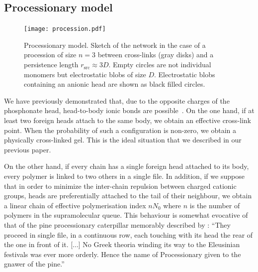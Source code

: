 \documentclass[journal=jacsat,manuscript=article]{achemso}
\begin{document}

\subsection{Processionary model}

\begin{figure}
\texttt{[image: procession.pdf]}
\caption{Processionary model. Sketch of the network in the case of a procession of size $n=3$ between cross-links (gray disks) and a persistence length $r_\mathrm{src}\approx 3D$. Empty circles are not individual monomers but electrostatic blobs of size $D$. Electrostatic blobs containing an anionic head are shown as black filled circles.}
\label{fig:dissociation}
\end{figure}

We have previously demonstrated that, due to the opposite charges of the phosphonate head, head-to-body ionic bonds are possible~\cite{Srour2014}. On the one hand, if at least two foreign heads attach to the same body, we obtain an effective cross-link point. When the probability of such a configuration is non-zero, we obtain a physically cross-linked gel. This is the ideal situation that we described in our previous paper.

On the other hand, if every chain has a single foreign head attached to its body, every polymer is linked to two others in a single file. In addition, if we suppose that in order to minimize the inter-chain repulsion between charged cationic groups, heads are preferentially attached to the tail of their neighbour, we obtain a linear chain of effective polymerisation index $n N_0$ where $n$ is the number of polymers in the supramolecular queue. This behaviour is somewhat evocative of that of the pine processionary caterpillar memorably described by \citet{Fabre1916}: 
``They proceed in single file, in a continuous row, each touching with its head the rear of the one in front of it. [...] No Greek theoria winding its way to the Eleusinian festivals was ever more orderly. Hence the name of Processionary given to the gnawer of the pine.''
\end{document}
